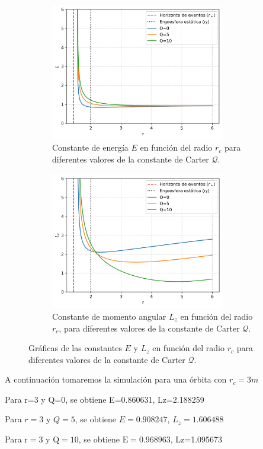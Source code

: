 \begin{figure}[H]
\begin{subfigure}{0.5\textwidth}
\includegraphics[width=0.9\linewidth, height=6cm]{AgujerosNegros/kerr/geodesics_plots/circular_orbits_E_vs_r.png} 
\caption{Constante de energía $E$ en función del radio $r_c$ para diferentes valores de la constante de Carter $\mathcal{Q}$.}
\end{subfigure}
\begin{subfigure}{0.5\textwidth}
\includegraphics[width=0.9\linewidth, height=6cm]{AgujerosNegros/kerr/geodesics_plots/circular_orbits_Lz_vs_r.png}
\caption{Constante de momento angular $L_z$ en función del radio $r_c$, para diferentes valores de la constante de Carter $\mathcal{Q}$.}
\end{subfigure}
\caption{Gráficas de las constantes $E$ y $L_z$ en función del radio $r_c$ para diferentes valores de la constante de Carter $\mathcal{Q}$.}
\end{figure}

A continuación tomaremos la simulación para una órbita con $r_c = 3m$

Para r=3 y Q=0, se obtiene E=0.860631, Lz=2.188259

Para $r=3$ y $Q=5$, se obtiene $E=0.908247$, $L_z=1.606488$

Para $\mathrm{r}=3$ y $\mathrm{Q}=10$, se obtiene $\mathrm{E}=0.968963$, Lz=1.095673

